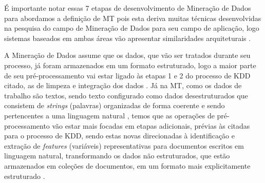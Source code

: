 
É importante notar essas 7 etapas de desenvolvimento de Mineração de Dados para abordamos a definição de MT pois esta deriva muitas técnicas desenvolvidas na pesquisa do campo de Mineração de Dados para seu campo de aplicação, logo sistemas baseados em ambas áreas vão apresentar similaridades arquiteturais \cite{Feldman:2006:TMH:1076381}. 



A Mineração de Dados assume que os dados, que vão ser tratados durante seu processo, já foram armazenados em um formato estruturado, logo a maior parte de seu pré-processamento vai estar ligado às etapas 1 e 2 do processo de KDD citado, as de limpeza e integração dos dados \cite{Feldman:2006:TMH:1076381}. %
Já na MT, como os dados de trabalho são textos, sendo texto configurado como dados desestruturados que consistem de \textit{strings} (palavras) organizadas de forma coerente e sendo pertencentes a uma linguagem natural \cite{Jo2018TMCIBDC}, temos que as operações de pré-processamento vão estar mais focadas em etapas adicionais, prévias às citadas para o processo de KDD, sendo estas novas direcionadas à identificação e extração de \textit{features} (variáveis) representativas para documentos escritos em linguagem natural, transformando os dados não estruturados, que estão armazenados em coleções de documentos, em um formato mais explicitamente estruturado \cite{Feldman:2006:TMH:1076381}.

